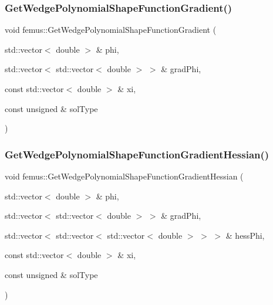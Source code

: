 \subsubsection{\texorpdfstring{Get\+Wedge\+Polynomial\+Shape\+Function\+Gradient()}{GetWedgePolynomialShapeFunctionGradient()}}
{\footnotesize\ttfamily void femus\+::\+Get\+Wedge\+Polynomial\+Shape\+Function\+Gradient (\begin{DoxyParamCaption}\item[{std\+::vector$<$ double $>$ \&}]{phi,  }\item[{std\+::vector$<$ std\+::vector$<$ double $>$ $>$ \&}]{grad\+Phi,  }\item[{const std\+::vector$<$ double $>$ \&}]{xi,  }\item[{const unsigned \&}]{sol\+Type }\end{DoxyParamCaption})}

\mbox{\label{namespacefemus_ad4742e8fddfada4e3dbfe5aae4683694}} 
\subsubsection{\texorpdfstring{Get\+Wedge\+Polynomial\+Shape\+Function\+Gradient\+Hessian()}{GetWedgePolynomialShapeFunctionGradientHessian()}}
{\footnotesize\ttfamily void femus\+::\+Get\+Wedge\+Polynomial\+Shape\+Function\+Gradient\+Hessian (\begin{DoxyParamCaption}\item[{std\+::vector$<$ double $>$ \&}]{phi,  }\item[{std\+::vector$<$ std\+::vector$<$ double $>$ $>$ \&}]{grad\+Phi,  }\item[{std\+::vector$<$ std\+::vector$<$ std\+::vector$<$ double $>$ $>$ $>$ \&}]{hess\+Phi,  }\item[{const std\+::vector$<$ double $>$ \&}]{xi,  }\item[{const unsigned \&}]{sol\+Type }\end{DoxyParamCaption})}

\mbox{\label{namespacefemus_a351729c013d7b6818938252c320ad1ff}} 
